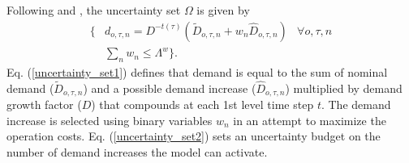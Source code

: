 \documentclass[final]{IEEEtran}
\begin{document}
Following \cite{Minguez} and \cite{Baringo2018}, the uncertainty set $\Omega$ is given by
\begin{align}
\label{uncertainty_set1}\{ &d_{o, \tau, n} = D^{-t(\tau)} (\tilde{D}_{o, \tau, n} + w_n \hat{D}_{o, \tau, n}) & \forall o, \tau, n \\
&\label{uncertainty_set2}\sum\limits_n w_{n} \leq \Lambda^w \}.
\end{align}
Eq. (\ref{uncertainty_set1}) defines that demand is equal to the sum of nominal demand ($\tilde{D}_{o, \tau, n}$) and a possible demand increase ($\hat{D}_{o, \tau, n}$) multiplied by demand growth factor ($D$) that compounds at each 1st level time step $t$. The demand increase is selected using binary variables $w_n$ in an attempt to maximize the operation costs. Eq. (\ref{uncertainty_set2}) sets an uncertainty budget on the number of demand increases the model can activate.
\end{document}
